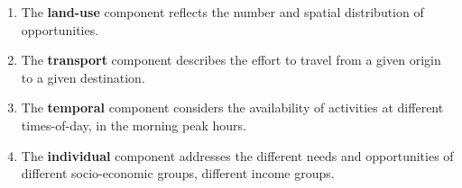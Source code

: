 \begin{enumerate}
	\item The \textbf{land-use} component reflects
	the number and spatial distribution of opportunities.
	
	\item The \textbf{transport} component describes the effort
	to travel from a given origin to a given destination.
	
	\item The \textbf{temporal} component considers the availability of activities at
	different times-of-day, \eg in the morning peak hours.
	
	\item The \textbf{individual} component addresses the different needs and
	opportunities of different socio-economic groups, \eg different income groups.
\end{enumerate}


